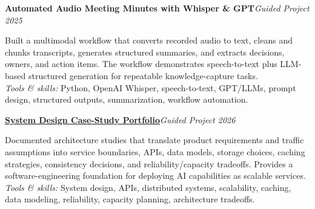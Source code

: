 \documentclass[9pt,letterpaper]{extarticle}
\newcommand{\project}[3]{\Needspace{5\baselineskip}\textbf{#1}\hfill\textit{#2 \textbar{} #3}\par}
\begin{document}
\project{Automated Audio Meeting Minutes with Whisper \& GPT}{Guided Project}{2025}
Built a multimodal workflow that converts recorded audio to text, cleans and chunks transcripts, generates structured summaries, and extracts decisions, owners, and action items. The workflow demonstrates speech-to-text plus LLM-based structured generation for repeatable knowledge-capture tasks.\\[-1pt]
{\small\textit{Tools \& skills:} Python, OpenAI Whisper, speech-to-text, GPT/LLMs, prompt design, structured outputs, summarization, workflow automation.}

\project{\href{https://github.com/WaseemRaza844/system-design-masterclass}{System Design Case-Study Portfolio}}{Guided Project}{2026}
Documented architecture studies that translate product requirements and traffic assumptions into service boundaries, APIs, data models, storage choices, caching strategies, consistency decisions, and reliability/capacity tradeoffs. Provides a software-engineering foundation for deploying AI capabilities as scalable services.\\[-1pt]
{\small\textit{Tools \& skills:} System design, APIs, distributed systems, scalability, caching, data modeling, reliability, capacity planning, architecture tradeoffs.}
\end{document}
